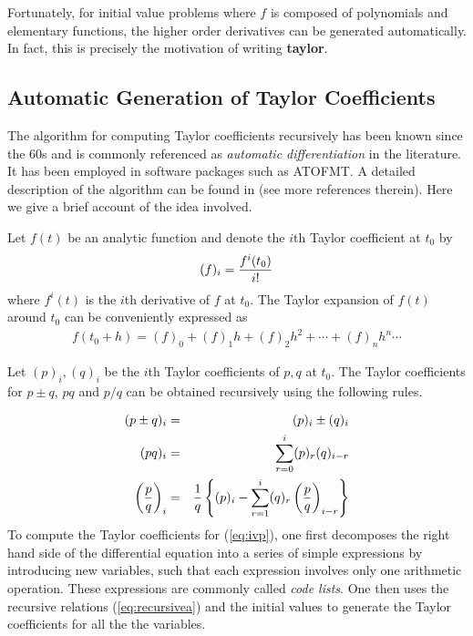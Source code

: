 \documentclass[10pt]{article}
\theoremstyle{remark}
\newcommand{\taylorname}{{\bf taylor}}
\begin{document}
Fortunately, for initial value problems where $f$ is composed of
polynomials and elementary functions, the higher order derivatives can
be generated automatically. In fact, this is precisely the motivation
of writing \taylorname{}.

\subsection*{Automatic Generation of Taylor Coefficients}

The algorithm for computing Taylor coefficients recursively has been
known since the 60s and is commonly referenced as {\it automatic
  differentiation} in the literature. It has been employed in software
packages such as ATOFMT.  A detailed description of the algorithm can
be found in \cite{JZ} (see more references therein).  Here we give a
brief account of the idea involved.


Let $f(t)$ be an analytic function and denote the $i$th Taylor
coefficient at $t_0$ by
\begin{eqnarray*}
(f)_i = {{f^{i}(t_0)} \over {i!}}
\end{eqnarray*}
where $f^{i}(t)$ is the $i$th derivative of $f$ at $t_0$. 
The Taylor expansion of $f(t)$ around $t_0$ can be
conveniently expressed as
\begin{eqnarray*}
f(t_0 +h) = (f)_0 + (f)_1 h + (f)_2 h^2 + \cdots + (f)_n h^n  \cdots
\end{eqnarray*}

Let $(p)_i, (q)_i$ be the $i$th Taylor coefficients of $p, q$ at
$t_0$. The Taylor coefficients for $p\pm q$, $pq$ and $p/q$ can be
obtained recursively using the following rules.

\begin{eqnarray}
\label{eq:recursivea}
(p\pm q)_i &=& (p)_i \pm (q)_i \cr
(p q)_i &=& \sum_{r=0}^{i} (p)_r (q)_{i-r} \cr
\left({p\over q}\right)_i &=& {1\over q}\left\{ 
(p)_i - \sum_{r=1}^{i} (q)_r \left({p\over q}\right)_{i-r}\right\} 
\end{eqnarray}
To compute the Taylor coefficients for (\ref{eq:ivp}), one first
decomposes the right hand side of the differential equation into a
series of simple expressions by introducing new variables, such that
each expression involves only one arithmetic operation. These
expressions are commonly called {\it code lists}. One then uses the
recursive relations (\ref{eq:recursivea}) and the initial values to
generate the Taylor coefficients for all the the variables.
\end{document}
